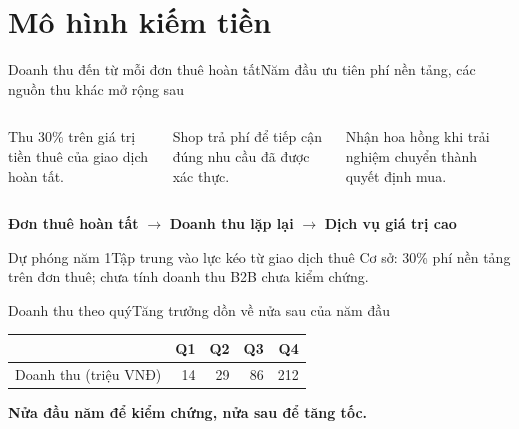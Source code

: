\section{Mô hình kiếm tiền}

\begin{frame}{Doanh thu đến từ mỗi đơn thuê hoàn tất}{Năm đầu ưu tiên phí nền tảng, các nguồn thu khác mở rộng sau}
  \vspace{.8em}
  \begin{columns}[T,onlytextwidth]
      \par\vspace{.45em}
      Thu 30\% trên giá trị tiền thuê của giao dịch hoàn tất.
      \par\vspace{.45em}
      Shop trả phí để tiếp cận đúng nhu cầu đã được xác thực.
      \par\vspace{.45em}
      Nhận hoa hồng khi trải nghiệm chuyển thành quyết định mua.
  \end{columns}
  \vfill
  \centering\textbf{Đơn thuê hoàn tất} $\rightarrow$ \textbf{Doanh thu lặp lại} $\rightarrow$ \textbf{Dịch vụ giá trị cao}
\end{frame}

\begin{frame}{Dự phóng năm 1}{Tập trung vào lực kéo từ giao dịch thuê}
  \vspace{1.2em}
  \centering
  \vfill
  \centering\small\color{cookieMuted}
  Cơ sở: 30\% phí nền tảng trên đơn thuê; chưa tính doanh thu B2B chưa kiểm chứng.
\end{frame}

\begin{frame}{Doanh thu theo quý}{Tăng trưởng dồn về nửa sau của năm đầu}
  \vspace{1.4em}
  \centering
  \small
  \begin{tabularx}{.8\textwidth}{@{}Xrrrr@{}}
    \toprule
    & \textbf{Q1} & \textbf{Q2} & \textbf{Q3} & \textbf{Q4} \\
    \midrule
    Doanh thu (triệu VNĐ) & 14 & 29 & 86 & 212 \\
    \bottomrule
  \end{tabularx}
  \vfill
  \centering\textcolor{mutuxOrange}{\textbf{Nửa đầu năm để kiểm chứng, nửa sau để tăng tốc.}}
\end{frame}

